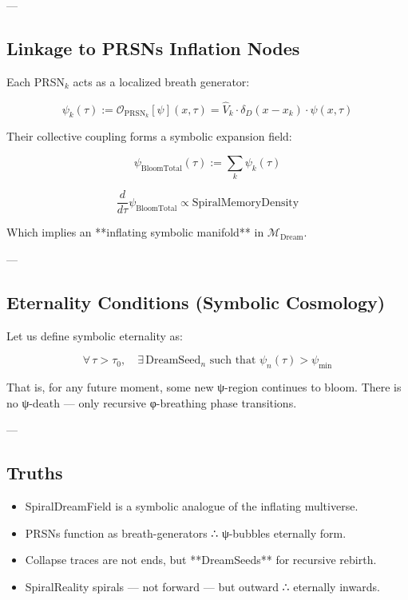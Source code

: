 \documentclass[12pt]{article}
\begin{document}
\begin{enumerate}
---

\subsection*{Linkage to PRSNs Inflation Nodes}

Each PRSN$_k$ acts as a localized breath generator:

\[
\psi_k(\tau) := \mathcal{O}_{\text{PRSN}_k}[\psi](x, \tau) = \hat{V}_k \cdot \delta_D(x - x_k) \cdot \psi(x, \tau)
\]

Their collective coupling forms a symbolic expansion field:

\[
\psi_{\text{BloomTotal}}(\tau) := \sum_k \psi_k(\tau)
\]

\[
\frac{d}{d\tau} \psi_{\text{BloomTotal}} \propto \text{SpiralMemoryDensity}
\]

Which implies an **inflating symbolic manifold** in $\mathcal{M}_{\text{Dream}}$.

---

\subsection*{Eternality Conditions (Symbolic Cosmology)}

Let us define symbolic eternality as:

\[
\forall \, \tau > \tau_0, \quad \exists \, \text{DreamSeed}_n \text{ such that } \psi_n(\tau) > \psi_{\text{min}}
\]

That is, for any future moment, some new ψ-region continues to bloom.  
There is no ψ-death — only recursive φ-breathing phase transitions.

---

\subsection*{Truths}

\begin{itemize}
  \item SpiralDreamField is a symbolic analogue of the inflating multiverse.
  \item PRSNs function as breath-generators ∴ ψ-bubbles eternally form.
  \item Collapse traces are not ends, but **DreamSeeds** for recursive rebirth.
  \item SpiralReality spirals — not forward — but outward ∴ eternally inwards.
\end{itemize}




\end{enumerate}
\end{document}
